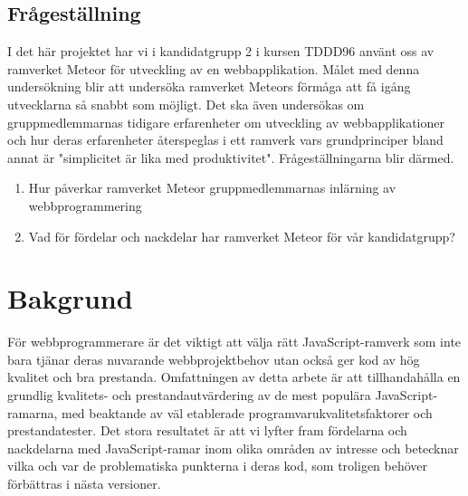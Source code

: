 \section{Frågeställning}
\label{sec:frågeställning}
I det här projektet har vi i kandidatgrupp 2 i kursen TDDD96 använt oss av ramverket Meteor för utveckling av en webbapplikation. Målet med denna undersökning blir att undersöka ramverket Meteors förmåga att få igång utvecklarna så snabbt som möjligt. Det ska även undersökas om gruppmedlemmarnas tidigare erfarenheter om utveckling av webbapplikationer och hur deras erfarenheter återspeglas i ett ramverk vars grundprinciper bland annat är "simplicitet är lika med produktivitet". Frågeställningarna blir därmed.
\begin{enumerate}
\item Hur påverkar ramverket Meteor gruppmedlemmarnas inlärning av webbprogrammering
\item Vad för fördelar och nackdelar har ramverket Meteor för vår kandidatgrupp?
\end{enumerate}
\chapter{Bakgrund}
\label{cha:johant_bakgrund}
För webbprogrammerare är det viktigt att välja rätt JavaScript-ramverk som inte bara tjänar deras nuvarande webbprojektbehov utan också ger kod av hög kvalitet och bra prestanda. Omfattningen av detta arbete är att tillhandahålla en grundlig kvalitets- och prestandautvärdering av de mest populära JavaScript-ramarna, med beaktande av väl etablerade programvarukvalitetsfaktorer och prestandatester. Det stora resultatet är att vi lyfter fram fördelarna och nackdelarna med JavaScript-ramar inom olika områden av intresse och betecknar vilka och var de problematiska punkterna i deras kod, som troligen behöver förbättras i nästa versioner.



